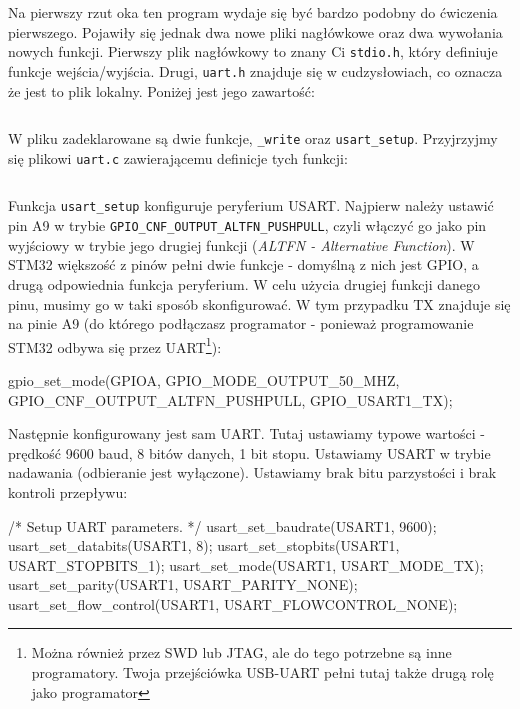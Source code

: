 \documentclass{pdfBooklets}
\begin{document}
\inputminted[frame=single,firstline=6]{c}{stm32-examples/02_uart/main.c}

Na pierwszy rzut oka ten program wydaje się być bardzo podobny do ćwiczenia pierwszego. Pojawiły się jednak dwa nowe pliki nagłówkowe
oraz dwa wywołania nowych funkcji. Pierwszy plik nagłówkowy to znany Ci \Verb$stdio.h$, który definiuje funkcje wejścia/wyjścia. Drugi, \Verb$uart.h$
znajduje się w cudzysłowiach, co oznacza że jest to plik lokalny. Poniżej jest jego zawartość:

\inputminted[frame=single]{c}{stm32-examples/02_uart/uart.h}

W pliku zadeklarowane są dwie funkcje, \Verb$_write$ oraz \Verb$usart_setup$. Przyjrzyjmy się plikowi \Verb$uart.c$ zawierającemu definicje tych funkcji:

\inputminted[frame=single]{c}{stm32-examples/02_uart/uart.c}

Funkcja \Verb$usart_setup$ konfiguruje peryferium USART.
%
Najpierw należy ustawić pin A9 w trybie \Verb$GPIO_CNF_OUTPUT_ALTFN_PUSHPULL$, czyli włączyć go jako
pin wyjściowy w trybie jego drugiej funkcji (\emph{ALTFN - Alternative Function}). W STM32 większość z pinów pełni dwie funkcje - domyślną z nich jest
GPIO, a drugą odpowiednia funkcja peryferium. W celu użycia drugiej funkcji danego pinu, musimy go w taki sposób skonfigurować. W tym przypadku
TX znajduje się na pinie A9 (do którego podłączasz programator - ponieważ programowanie STM32 odbywa się przez UART\footnote{Można również przez
SWD lub JTAG, ale do tego potrzebne są inne programatory. Twoja przejściówka USB-UART pełni tutaj także drugą rolę jako programator}):

\begin{CodeFrame*}[c]{}
  gpio_set_mode(GPIOA, GPIO_MODE_OUTPUT_50_MHZ,
                GPIO_CNF_OUTPUT_ALTFN_PUSHPULL, GPIO_USART1_TX);
\end{CodeFrame*}

Następnie konfigurowany jest sam UART. Tutaj ustawiamy typowe wartości - prędkość 9600 baud\footnotemark, 8 bitów danych, 1 bit stopu.
Ustawiamy USART w trybie nadawania (odbieranie jest wyłączone). Ustawiamy brak bitu parzystości i brak kontroli przepływu:

\begin{CodeFrame*}[c]{}
  /* Setup UART parameters. */
  usart_set_baudrate(USART1, 9600);
  usart_set_databits(USART1, 8);
  usart_set_stopbits(USART1, USART_STOPBITS_1);
  usart_set_mode(USART1, USART_MODE_TX);
  usart_set_parity(USART1, USART_PARITY_NONE);
  usart_set_flow_control(USART1, USART_FLOWCONTROL_NONE);
\end{CodeFrame*}
\end{document}
